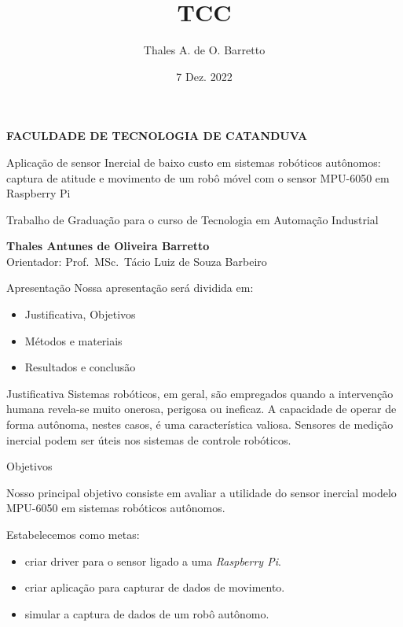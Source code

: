 \documentclass{beamer}
\title{TCC}
\author{Thales A. de O. Barretto}
\date{7 Dez. 2022}
\begin{document}
\begin{frame}\label{capa}
\begin{centering}
    {\scriptsize 
    \textbf{FACULDADE DE TECNOLOGIA DE CATANDUVA\\
    }}
    \vfill

    {\normalsize
    Aplicação de sensor Inercial de baixo custo em sistemas robóticos autônomos:
    captura de atitude e movimento de um robô móvel com 
    o sensor MPU-6050 em Raspberry Pi\\
    }
    \vspace{16pt}

    {\tiny
    Trabalho de Graduação para o curso de Tecnologia em Automação Industrial\\
    }
    \vfill

    {\normalsize
    {\textbf{Thales Antunes de Oliveira Barretto}}\\
    \vspace{16pt}
    {\scriptsize Orientador: Prof.~MSc.~Tácio Luiz de Souza Barbeiro}\\
    }
\end{centering}
\end{frame}

\begin{frame}{Apresentação}
    Nossa apresentação será dividida em:
    \begin{itemize}
        \item Justificativa, Objetivos
        \item Métodos e materiais
        \item Resultados e conclusão
    \end{itemize}
\end{frame}

\begin{frame}{Justificativa}
        Sistemas robóticos, em geral, são empregados quando a intervenção humana revela-se muito onerosa, perigosa ou ineficaz. A capacidade de operar de forma autônoma, nestes casos, é uma característica valiosa. Sensores de medição inercial podem ser úteis nos sistemas de controle robóticos.
\end{frame}

\begin{frame}{Objetivos}

    Nosso principal objetivo consiste em avaliar a utilidade do sensor inercial modelo MPU-6050 em sistemas robóticos autônomos.\\
    \vfill

    Estabelecemos como metas:
    \begin{itemize}
    \item criar driver para o sensor ligado a uma \emph{Raspberry Pi}.
    \item criar aplicação para capturar de dados de movimento.
    \item simular a captura de dados de um robô autônomo.
    \end{itemize}

\end{frame}
\end{document}
